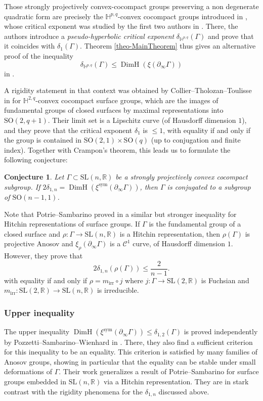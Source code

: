 \documentclass[JEP,XML,SOM,Unicode,NoEqCountersInSection,NoFloatCountersInSection,published]{cedram}
\newcommand{\irr}{\mathrm{irr}}
\newcommand{\sym}{\mathrm{sym}}
\newtheorem{conj}[theo]{Conjecture}
\theoremstyle{definition}
\newcommand{\R}{\mathbb{R}}
\newcommand{\Hyp}{\mathbb{H}}
\newcommand{\SL}{\mathrm{SL}}
\newcommand{\SO}{\mathrm{SO}}
\DeclareMathOperator{\DimH}{DimH}
\let\G\Gamma
\begin{document}
Those strongly projectively convex-cocompact groups preserving a non degenerate quadratic form are precisely the $\Hyp^{p,q}$-convex cocompact groups introduced in \cite{DGKSOpq}, whose critical exponent was studied by the first two authors in \cite{GM18}. There, the authors introduce a \emph{pseudo-hyperbolic critical exponent} $\delta_{\Hyp^{p,q}}(\G)$ and prove that it coincides with $\delta_1(\G)$. Theorem \ref{theo-MainTheorem} thus gives an alternative proof of the inequality
\[\delta_{\Hyp^{p,q}}(\G) \leq \DimH(\xi(\partial_\infty\Gamma))\]
in \cite[Th.\,1.2]{GM18}.

A rigidity statement in that context was obtained by Collier--Tholozan--Toulisse in \cite{CCT17} for $\Hyp^{2,q}$-convex cocompact surface groups, which are the images of fundamental groups of closed surfaces by maximal representations into $\SO(2,q+1)$. Their limit set is a Lipschitz curve (of Hausdorff dimension $1$), and they prove that the critical exponent $\delta_1$ is $\leq 1$, with equality if and only if the group is contained in $\SO(2,1)\times \SO(q)$ (up to conjugation and finite index). Together with Crampon's theorem, this leads us to formulate the following conjecture:

\begin{conj}
Let $\Gamma\!\subset\!\SL(n,\R)$ be a strongly projectively convex cocompact sub\-group. If $2\delta_{1,n} \!=\! \DimH(\xi^{\sym}(\partial_\infty \G))$, then $\G$ is conjugated to a subgroup of \hbox{$\SO(n-1,1)$}.
\end{conj}

Note that Potrie--Sambarino proved in \cite{potrie2014} a similar but stronger inequality for Hitchin representations of surface groups. If $\G$ is the fundamental group of a closed surface and $\rho:\G\to \SL(n,\R)$ is a Hitchin representation, then $\rho(\G)$ is projective Anosov and $\xi_\rho(\partial_\infty \G)$ is a $\mathcal{C}^1$ curve, of Hausdorff dimension $1$. However, they prove that
\[2\delta_{1,n}(\rho(\G)) \leq \frac{2}{n-1}.\]
with equality if and only if $\rho = m_{\irr} \circ j$ where $j:\G \to \SL(2,\R)$ is Fuchsian and $m_{\irr}: \SL(2,\R) \to \SL(n,\R)$ is irreducible.

\subsubsection*{Upper inequality}

The upper inequality $\DimH(\xi^{\sym}(\partial_\infty \G)) \leq \delta_{1,2}(\G)$ is proved inde\-pendently by Pozzetti--Sambarino--Wienhard in \cite{PSW19}. There, they also find a sufficient criterion for this inequality to be an equality. This criterion is satisfied by many families of Anosov groups, showing in particular that the equality can be stable under small deformations of $\G$. Their work generalizes a result of Potrie--Sambarino for surface groups embedded in $\SL(n,\R)$ via a Hitchin representation. They are in stark contrast with the rigidity phenomena for the $\delta_{1,n}$ discussed above.
\end{document}
